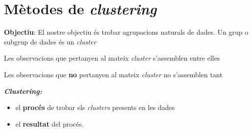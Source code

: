 
\chapter{Mètodes de \emph{clustering}}
\textbf{Objectiu}: El nostre objectiu és trobar agrupacions naturals de dades. Un grup o subgrup de dades és un \emph{cluster}

Les observacions que pertanyen al mateix \emph{cluster} s'assemblen entre elles

Les observacions que \textbf{no} pertanyen al mateix \emph{cluster} no s'assemblen tant

\textbf{\emph{Clustering:}}
\begin{itemize}
	\item el \textbf{procés} de trobar els \emph{clusters} presents en les dades
	\item el \textbf{resultat} del procés.
\end{itemize}


